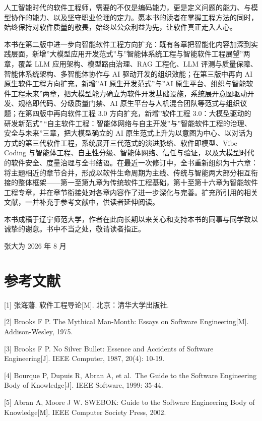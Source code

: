 \documentclass[12pt,a4paper,twoside,openany]{ctexbook}
\numberwithin{figure}{chapter}
\numberwithin{table}{chapter}
\begin{document}
人工智能时代的软件工程师，需要的不仅是编码能力，更是定义问题的能力、与模型协作的能力、以及坚守职业伦理的定力。愿本书的读者在掌握工程方法的同时，始终保持对软件质量的敬畏，始终以公众利益为先，让软件真正走入人心。

本书在第二版中进一步向智能软件工程方向扩充：既有各章把智能化内容加深到实践层面，新增''大模型应用开发范式''与''智能体系统工程与智能软件工程展望''两章，覆盖
LLM 应用架构、模型路由治理、RAG 工程化、LLM
评测与质量保障、智能体系统架构、多智能体协作与 AI
驱动开发的组织效能；在第三版中再向 AI 原生软件工程方向扩充，新增''AI
原生开发范式''与''AI
原生平台、组织与智能软件工程未来''两章，把大模型能力确立为软件开发基础设施，系统展开意图驱动开发、规格即代码、分级质量门禁、AI
原生平台与人机混合团队等范式与组织议题；在第四版中再向软件工程 3.0
方向扩充，新增''软件工程
3.0：大模型驱动的研发新范式''\,``自主软件工程：智能体网络与自主开发''与''智能软件工程的治理、安全与未来''三章，把大模型确立的
AI
原生范式上升为以意图为中心、以对话为方式的第三代软件工程，系统展开三代范式的演进脉络、软件即模型、Vibe
Coding
与智能体工程、自主性分级、智能体网络、信任与验证，以及大模型时代的软件安全、度量治理与全书结语。在最近一次修订中，全书重新组织为十六章：将主题相近的章节合并，形成以软件生命周期为主线、传统与智能两大部分相互衔接的整体框架------第一至第九章为传统软件工程基础，第十至第十六章为智能软件工程专章，并在章节衔接处对各章内容作了进一步深化与完善。扩充所引用的相关文献，一并补充于参考文献中，供读者延伸阅读。

本书成稿于辽宁师范大学，作者在此向长期以来关心和支持本书的同事与同学致以诚挚的谢意。书中不当之处，敬请读者指正。

张大为 2026 年 8 月

\section{参考文献}\label{ux53c2ux8003ux6587ux732e}

{[}1{]} 张海藩. 软件工程导论{[}M{]}. 北京：清华大学出版社.

{[}2{]} Brooks F P. The Mythical Man-Month: Essays on Software
Engineering{[}M{]}. Addison-Wesley, 1975.

{[}3{]} Brooks F P. No Silver Bullet: Essence and Accidents of Software
Engineering{[}J{]}. IEEE Computer, 1987, 20(4): 10-19.

{[}4{]} Bourque P, Dupuis R, Abran A, et al.~The Guide to the Software
Engineering Body of Knowledge{[}J{]}. IEEE Software, 1999: 35-44.

{[}5{]} Abran A, Moore J W. SWEBOK: Guide to the Software Engineering
Body of Knowledge{[}M{]}. IEEE Computer Society Press, 2002.
\end{document}

